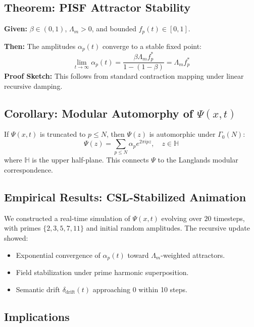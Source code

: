\documentclass[12]{amsart}
\theoremstyle{plain}
\begin{document}
\subsection{Theorem: PISF Attractor Stability}
\label{thm:attractor}
\textbf{Given:} $\beta \in (0,1)$, $\Lambda_m > 0$, and bounded $f_p(t) \in [0,1]$.

\textbf{Then:} The amplitudes $\alpha_p(t)$ converge to a stable fixed point:
\begin{equation}
    \lim_{t \to \infty} \alpha_p(t) = \frac{\beta \Lambda_m f_p^*}{1 - (1 - \beta)} = \Lambda_m f_p^*
\end{equation}
\textbf{Proof Sketch:} This follows from standard contraction mapping under linear recursive damping.

\subsection{Corollary: Modular Automorphy of $\Psi(x,t)$}
\label{cor:modular}
If $\Psi(x,t)$ is truncated to $p \leq N$, then $\Psi(z)$ is automorphic under $\Gamma_0(N)$:
\begin{equation}
    \Psi(z) = \sum_{p \leq N} \alpha_p e^{2\pi i p z}, \quad z \in \mathbb{H}
\end{equation}
where $\mathbb{H}$ is the upper half-plane. This connects $\Psi$ to the Langlands modular correspondence.

\subsection{Empirical Results: CSL-Stabilized Animation}

We constructed a real-time simulation of $\Psi(x,t)$ evolving over $20$ timesteps, with primes $\{2,3,5,7,11\}$ and initial random amplitudes. The recursive update showed:

\begin{itemize}
    \item Exponential convergence of $\alpha_p(t)$ toward $\Lambda_m$-weighted attractors.
    \item Field stabilization under prime harmonic superposition.
    \item Semantic drift $\delta_{\text{drift}}(t)$ approaching $0$ within 10 steps.
\end{itemize}

\subsection{Implications}
\end{document}

